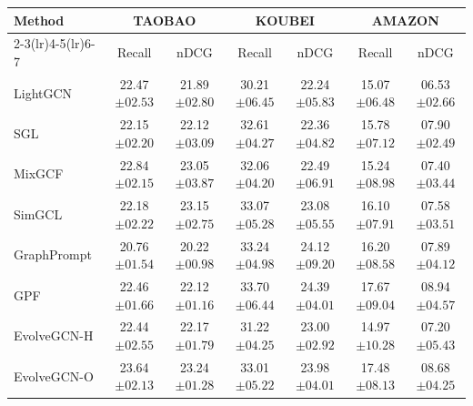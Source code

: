 \documentclass[letterpaper]{article} %
\begin{document}
\begin{table}[t]
    \centering
    \begin{tabular}{lcccccc}
        \toprule
        \multirow{2}{*}{Method} & \multicolumn{2}{c}{TAOBAO} & \multicolumn{2}{c}{KOUBEI} & \multicolumn{2}{c}{AMAZON} \\
        \cmidrule(lr){2-3}\cmidrule(lr){4-5}\cmidrule(lr){6-7}
        ~ & Recall & nDCG & Recall & nDCG & Recall & nDCG \\
        \midrule
        LightGCN & 22.47$\scriptstyle{\pm 02.53}$ & 21.89$\scriptstyle{\pm 02.80}$ & 30.21$\scriptstyle{\pm 06.45}$ & 22.24$\scriptstyle{\pm 05.83}$ & 15.07$\scriptstyle{\pm 06.48}$ & 06.53$\scriptstyle{\pm 02.66}$ \\ 
        SGL & 22.15$\scriptstyle{\pm 02.20}$ & 22.12$\scriptstyle{\pm 03.09}$ & 32.61$\scriptstyle{\pm 04.27}$ & 22.36$\scriptstyle{\pm 04.82}$ & 15.78$\scriptstyle{\pm 07.12}$ & 07.90$\scriptstyle{\pm 02.49}$ \\ 
        MixGCF & 22.84$\scriptstyle{\pm 02.15}$ & 23.05$\scriptstyle{\pm 03.87}$ & 32.06$\scriptstyle{\pm 04.20}$ & 22.49$\scriptstyle{\pm 06.91}$ & 15.24$\scriptstyle{\pm 08.98}$ & 07.40$\scriptstyle{\pm 03.44}$ \\ 
        SimGCL & 22.18$\scriptstyle{\pm 02.22}$ & 23.15$\scriptstyle{\pm 02.75}$ & 33.07$\scriptstyle{\pm 05.28}$ & 23.08$\scriptstyle{\pm 05.55}$ & 16.10$\scriptstyle{\pm 07.91}$ & 07.58$\scriptstyle{\pm 03.51}$ \\
        GraphPrompt  & 20.76$\scriptstyle{\pm 01.54}$ & 20.22$\scriptstyle{\pm 00.98}$ & {33.24}$\scriptstyle{\pm 04.98}$ & {24.12}$\scriptstyle{\pm 09.20}$ & {16.20}$\scriptstyle{\pm 08.58}$ & {07.89}$\scriptstyle{\pm 04.12}$ \\
        GPF          & 22.46$\scriptstyle{\pm 01.66}$ & 22.12$\scriptstyle{\pm 01.16}$ & {33.70}$\scriptstyle{\pm 06.44}$ & {24.39}$\scriptstyle{\pm 04.01}$ & {17.67}$\scriptstyle{\pm 09.04}$ & {08.94}$\scriptstyle{\pm 04.57}$ \\
        EvolveGCN-H  & 22.44$\scriptstyle{\pm 02.55}$ & 22.17$\scriptstyle{\pm 01.79}$ & {31.22}$\scriptstyle{\pm 04.25}$ & {23.00}$\scriptstyle{\pm 02.92}$ & {14.97}$\scriptstyle{\pm 10.28}$ & {07.20}$\scriptstyle{\pm 05.43}$ \\
        EvolveGCN-O  & 23.64$\scriptstyle{\pm 02.13}$ & 23.24$\scriptstyle{\pm 01.28}$ & {33.01}$\scriptstyle{\pm 05.22}$ & {23.98}$\scriptstyle{\pm 04.01}$ & {17.48}$\scriptstyle{\pm 08.13}$ & {08.68}$\scriptstyle{\pm 04.25}$ \\

\end{tabular}
\end{table}
\end{document}
